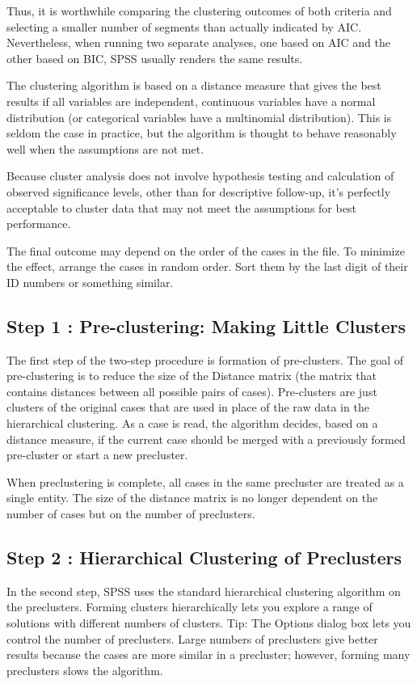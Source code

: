 \documentclass[a4paper,12pt]{report}
\begin{document}
Thus, it is worthwhile comparing the clustering
outcomes of both criteria and selecting a smaller number of segments than
actually indicated by AIC. Nevertheless, when running two separate analyses,
one based on AIC and the other based on BIC, SPSS usually renders the same
results.
\newpage


The clustering algorithm is based on a distance measure that gives the best results if all variables are independent, continuous variables have a normal distribution (or categorical variables have a multinomial distribution). This is seldom the case in practice, but the algorithm is thought to behave reasonably well when the assumptions are not met.

Because cluster analysis does not involve hypothesis testing and calculation of observed significance levels, other than for descriptive follow-up, it's perfectly acceptable to cluster data that may not meet the assumptions for best performance.

The final outcome may depend on the order of the cases in the file. To minimize the effect, arrange the cases in random order. Sort them by the last digit of their ID numbers or something similar.

\subsection{Step 1 : Pre-clustering: Making Little Clusters}
The first step of the two-step procedure is formation of pre-clusters. The goal of pre-clustering is to reduce the size of the Distance matrix (the matrix that contains distances between all
possible pairs of cases). Pre-clusters are just clusters of the original cases that are used in place of the raw data in the hierarchical clustering. As a case is read, the algorithm
decides, based on a distance measure, if the current case should be merged with a previously formed pre-cluster or start a new precluster.

When preclustering is complete, all cases in the same precluster are treated as a single entity. The size of the distance matrix is no longer dependent on the number of cases but on the number of preclusters.



\subsection{Step 2 : Hierarchical Clustering of Preclusters}
In the second step, SPSS uses the standard hierarchical clustering algorithm on the
preclusters. Forming clusters hierarchically lets you explore a range of solutions with
different numbers of clusters.
Tip: The Options dialog box lets you control the number of preclusters. Large numbers
of preclusters give better results because the cases are more similar in a precluster;
however, forming many preclusters slows the algorithm.
\end{document}
